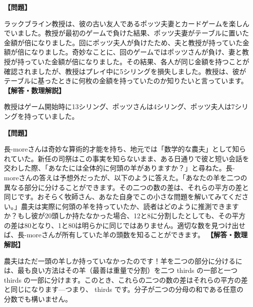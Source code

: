 \documentclass[10pt,a4paper,oneside,openany]{ltjsbook}
\begin{document}
\begin{tcolorbox}[colback=softblue,colframe=primaryblue,title=\textbf{第 119 問：ラックブラインの小さな損失 （原題: RACKBRANE'S LITTLE LOSS.）},arc=2mm,boxrule=1pt,breakable]
\textbf{【問題】}\par\vspace{0.3em}
ラックブライン教授は、彼の古い友人であるポッツ夫妻とカードゲームを楽しんでいました。教授が最初のゲームで負けた結果、ポッツ夫妻がテーブルに置いた金額が倍になりました。回にポッツ夫人が負けたため、夫と教授が持っていた金額が倍になりました。奇妙なことに、回のゲームではポッツさんが負け、妻と教授が持っていた金額が倍になりました。その結果、各人が同じ金額を持つことが確認されましたが、教授はプレイ中に5シリングを損失しました。教授は、彼がテーブルに基ったときに何枚の金額を持っていたのか知りたいと言っています。
\tcblower
\textbf{【解答・数理解説】}\par\vspace{0.3em}
教授はゲーム開始時に13シリング、ポッツさんは4シリング、ポッツ夫人は7シリングを持っていました。
\end{tcolorbox}

\begin{tcolorbox}[colback=softblue,colframe=primaryblue,title=\textbf{第 120 問：農夫と羊 （原題: THE FARMER AND HIS SHEEP.）},arc=2mm,boxrule=1pt,breakable]
\textbf{【問題】}\par\vspace{0.3em}
長-moreさんは奇妙な算術的才能を持ち、地元では「数学的な農夫」として知られていた。新任の司祭はこの事実を知らないまま、ある日通りで彼と短い会話を交わした際、「あなたには全体的に何頭の羊がありますか？」と尋ねた。長-moreさんの答えは予想外だったが、以下のように答えた。「あなたの羊を二つの異なる部分に分けることができます。その二つの数の差は、それらの平方の差と同じです。おそらく牧師さん、あなた自身でこの小さな問題を解いてみてください。」農夫は実際に何頭の羊を持っていたか、読者はどのように推測できますか？もし彼が20頭しか持たなかった場合、12と8に分割したとしても、その平方の差は80となり、1と80は明らかに同じではありません。適切な数を見つけ出せば、長-moreさんが所有していた羊の頭数を知ることができます。
\tcblower
\textbf{【解答・数理解説】}\par\vspace{0.3em}
農夫はただ一頭の羊しか持っていなかったのです！羊を二つの部分に分けるには、最も良い方法はその羊（最善は重量で分割）を二つ thirds の一部と一つ thirds の一部に分けます。このとき、これらの二つの数の差はそれらの平方の差と同じになります—つまり、 thirds です。分子が二つの分母の和である任意の分数でも構いません。
\end{tcolorbox}
\end{document}
